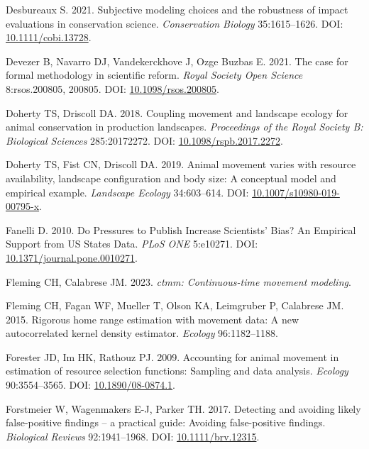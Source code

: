 \documentclass[10pt,a4paper]{article}
\newlength{\cslhangindent}
\newenvironment{CSLReferences}[2] %
 {\begin{list}{}{%
  \setlength{\itemindent}{0pt}
  \setlength{\leftmargin}{0pt}
  \setlength{\parsep}{0pt}
  \ifodd #1
   \setlength{\leftmargin}{\cslhangindent}
   \setlength{\itemindent}{-1\cslhangindent}
  \fi
  \setlength{\itemsep}{#2\baselineskip}}}
 {\end{list}}
\begin{document}
\begin{CSLReferences}{1}{0}
Desbureaux S. 2021. Subjective modeling choices and the robustness of impact evaluations in conservation science. \emph{Conservation Biology} 35:1615--1626. DOI: \href{https://doi.org/10.1111/cobi.13728}{10.1111/cobi.13728}.

Devezer B, Navarro DJ, Vandekerckhove J, Ozge Buzbas E. 2021. The case for formal methodology in scientific reform. \emph{Royal Society Open Science} 8:rsos.200805, 200805. DOI: \href{https://doi.org/10.1098/rsos.200805}{10.1098/rsos.200805}.

Doherty TS, Driscoll DA. 2018. Coupling movement and landscape ecology for animal conservation in production landscapes. \emph{Proceedings of the Royal Society B: Biological Sciences} 285:20172272. DOI: \href{https://doi.org/10.1098/rspb.2017.2272}{10.1098/rspb.2017.2272}.

Doherty TS, Fist CN, Driscoll DA. 2019. Animal movement varies with resource availability, landscape configuration and body size: A conceptual model and empirical example. \emph{Landscape Ecology} 34:603--614. DOI: \href{https://doi.org/10.1007/s10980-019-00795-x}{10.1007/s10980-019-00795-x}.

Fanelli D. 2010. Do {Pressures} to {Publish} {Increase} {Scientists}' {Bias}? {An} {Empirical} {Support} from {US} {States} {Data}. \emph{PLoS ONE} 5:e10271. DOI: \href{https://doi.org/10.1371/journal.pone.0010271}{10.1371/journal.pone.0010271}.

Fleming CH, Calabrese JM. 2023. \emph{{ctmm}: Continuous-time movement modeling}.

Fleming CH, Fagan WF, Mueller T, Olson KA, Leimgruber P, Calabrese JM. 2015. Rigorous home range estimation with movement data: {A} new autocorrelated kernel density estimator. \emph{Ecology} 96:1182--1188.

Forester JD, Im HK, Rathouz PJ. 2009. Accounting for animal movement in estimation of resource selection functions: Sampling and data analysis. \emph{Ecology} 90:3554--3565. DOI: \href{https://doi.org/10.1890/08-0874.1}{10.1890/08-0874.1}.

Forstmeier W, Wagenmakers E-J, Parker TH. 2017. Detecting and avoiding likely false-positive findings -- a practical guide: {Avoiding} false-positive findings. \emph{Biological Reviews} 92:1941--1968. DOI: \href{https://doi.org/10.1111/brv.12315}{10.1111/brv.12315}.


\end{CSLReferences}
\end{document}
